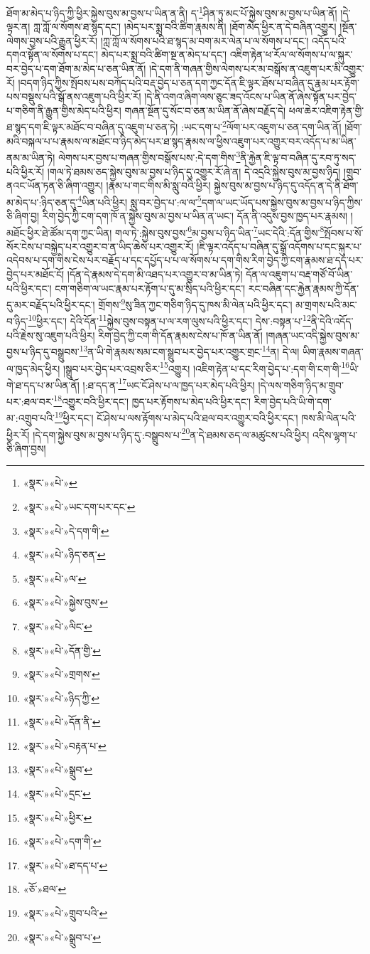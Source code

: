 ཐོག་མ་མེད་པ་ཉིད་ཀྱི་ཕྱིར་སྐྱེས་བུས་མ་བྱས་པ་ཡིན་ན་ནི། ད་\footnote{«སྣར་»«པེ་»}ཤིན་ཏུ་མང་པོ་སྐྱེས་བུས་མ་བྱས་པ་ཡིན་ནོ། །དེ་ལྟར་ན། ཀླ་ཀློ་ལ་སོགས་ཐ་སྙད་དང་། །མེད་པར་སྨྲ་བའི་ཚིག་རྣམས་ནི། །ཐོག་མེད་ཕྱིར་ན་དེ་བཞིན་འགྱུར། །སྔོན་ལེགས་བྱས་པའི་རྒྱུན་ཕྱིར་རོ། །ཀླ་ཀློ་ལ་སོགས་པའི་ཐ་སྙད་མ་བག་མར་ལེན་པ་ལ་སོགས་པ་དང་། འདོད་པའི་དགའ་སྟོན་ལ་སོགས་པ་དང་། མེད་པར་སྨྲ་བའི་ཚིག་སྔ་ན་མེད་པ་དང་། འཇིག་རྟེན་ཕ་རོལ་ལ་སོགས་པ་ལ་སྐུར་བར་བྱེད་པ་དག་ཐོག་མ་མེད་པ་ཅན་ཡིན་ནོ། །དེ་དག་ནི་གཞན་གྱིས་ལེགས་པར་མ་བསྒོས་ན་འཇུག་པར་མི་འགྱུར་རོ། །བདག་ཉིད་ཀྱིས་སྤོབས་པས་བཀོད་པའི་བརྡ་བྱེད་པ་ཅན་དག་ཀྱང་དོན་ཇི་ལྟར་ཐོས་པ་བཞིན་དུ་རྣམ་པར་རྟོག་པས་བསྡུས་པའི་སྒོ་ནས་འཇུག་པའི་ཕྱིར་རོ། །དེ་ནི་འགའ་ཞིག་ལས་ཅུང་ཟད་འོངས་པ་ཡིན་ནོ་ཞེས་སྟོན་པར་བྱེད་པ་གཅིག་ནི་རྒྱུན་གྱིས་མེད་པའི་ཕྱིར། གཞན་སྔོན་དུ་སོང་བ་ཅན་མ་ཡིན་ནོ་ཞེས་བརྗོད་དེ། ཕལ་ཆེར་འཇིག་རྟེན་གྱི་ཐ་སྙད་དག་ཇི་ལྟར་མཐོང་བ་བཞིན་དུ་འཇུག་པ་ཅན་ཏེ། :ཡང་དག་པ་\footnote{«སྣར་»«པེ་»ཡང་དག་པར་དང་}ལོག་པར་འཇུག་པ་ཅན་དག་ཡིན་ནོ། །ཐོག་མའི་བསྐལ་པ་པ་རྣམས་ལ་མཐོང་བ་ཉིད་མེད་པར་ཐ་སྙད་རྣམས་ལ་ཕྱིས་འཇུག་པར་འགྱུར་བར་འདོད་པ་མ་ཡིན་ནམ་མ་ཡིན་ཏེ། ལེགས་པར་བྱས་པ་གཞན་གྱིས་བསྒོས་པས་:དེ་དག་གིས་\footnote{«སྣར་»«པེ་»དེ་དག་གི་}ནི་རྐྱེན་ཇི་ལྟ་བ་བཞིན་དུ་རབ་ཏུ་སད་པའི་ཕྱིར་རོ། །གལ་ཏེ་ཐམས་ཅད་སྐྱེས་བུས་མ་བྱས་པ་ཉིད་དུ་འགྱུར་རོ་ཞེ་ན། དེ་འདྲའི་སྐྱེས་བུས་མ་བྱས་ཉིད། །གྲུབ་ནའང་ཡོན་ཏན་ཅི་ཞིག་འགྱུར། །རྣམ་པ་གང་གིས་མི་སླུ་བའི་ཕྱིར། སྐྱེས་བུས་མ་བྱས་པ་ཉིད་དུ་འདོད་ན་དེ་ནི་ཐོག་མ་མེད་པ་:ཉིད་ཅན་དུ་\footnote{«སྣར་»«པེ་»ཉིད་ཅན་}ཡིན་པའི་ཕྱིར། སླུ་བར་བྱེད་པ་:ལ་ལ་\footnote{«སྣར་»«པེ་»ལ་}དག་ལ་ཡང་ཡོད་པས་སྐྱེས་བུས་མ་བྱས་པ་ཉིད་ཀྱིས་ཅི་ཞིག་བྱ། རིག་བྱེད་ཀྱི་ངག་དག་ཁོ་ན་སྐྱེས་བུས་མ་བྱས་པ་ཡིན་ན་ཡང་། དོན་ནི་འདུས་བྱས་ཁྱད་པར་རྣམས། །མཐོང་ཕྱིར་ཐེ་ཚོམ་དག་ཀྱང་ཡིན། གལ་ཏེ་:སྐྱེས་བུས་བྱས་\footnote{«སྣར་»«པེ་»སྐྱེས་བུས་}མ་བྱས་པ་ཉིད་ཡིན་\footnote{«སྣར་»«པེ་»ལིང་}ཡང་དེའི་:དོན་གྱིས་\footnote{«སྣར་»«པེ་»དོན་གྱི་}སྤོབས་པ་སོ་སོར་ངེས་པ་བསྐྱེད་པར་འགྱུར་བ་ན་ཡིད་ཆེས་པར་འགྱུར་རོ། །ཇི་ལྟར་འདོད་པ་བཞིན་དུ་སྒྲོ་འདོགས་པ་དང་སྐུར་པ་འདེབས་པ་དག་གིས་ངེས་པར་བརྗོད་པ་དང་དཔྱོད་པ་པ་ལ་སོགས་པ་དག་གིས་རིག་བྱེད་ཀྱི་ངག་རྣམས་ཐ་དད་པར་བྱེད་པར་མཐོང་ངོ། །དོན་དེ་རྣམས་དེ་དག་མི་འཐད་པར་འགྱུར་བ་མ་ཡིན་ཏེ། དོན་ལ་འཇུག་པ་བརྡ་གཙོ་བོ་ཡིན་པའི་ཕྱིར་དང་། ངག་གཅིག་ལ་ཡང་རྣམ་པར་རྟོག་པ་དུ་མ་སྲིད་པའི་ཕྱིར་དང་། རང་བཞིན་དང་རྐྱེན་རྣམས་ཀྱི་དོན་དུ་མར་བརྗོད་པའི་ཕྱིར་དང་། གྲོགས་\footnote{«སྣར་»«པེ་»གྲགས་}སུ་ཟིན་ཀྱང་གཅིག་ཉིད་དུ་ཁས་མི་ལེན་པའི་ཕྱིར་དང་། མ་གྲགས་པའི་མང་བ་ཉིད་\footnote{«སྣར་»«པེ་»ཉིད་ཀྱི་}ཕྱིར་དང་། དེའི་དོན་\footnote{«སྣར་»«པེ་»དོན་ནི་}སྐྱེས་བུས་བསྟན་པ་ལ་རག་ལུས་པའི་ཕྱིར་དང་། དེས་:བསྟན་པ་\footnote{«སྣར་»«པེ་»བརྟན་པ་}ནི་དེའི་འདོད་པའི་རྗེས་སུ་འཇུག་པའི་ཕྱིར། རིག་བྱེད་ཀྱི་ངག་གི་དོན་རྣམས་ངེས་པ་ཁོ་ན་ཡིན་ནོ། །གཞན་ཡང་འདི་སྐྱེས་བུས་མ་བྱས་པ་ཉིད་དུ་བསྒྲུབས་\footnote{«སྣར་»«པེ་»སྒྲུབ་}ན་ཡི་གེ་རྣམས་སམ་ངག་སྒྲུབ་པར་བྱེད་པར་འགྱུར་གྲང་\footnote{«སྣར་»«པེ་»དྲང་}ན། དེ་ལ། ཡིག་རྣམས་གཞན་ལ་ཁྱད་མེད་ཕྱིར། །སྒྲུབ་པར་བྱེད་པར་འབྲས་ཅིར་\footnote{«སྣར་»«པེ་»ཕྱིར་}འགྱུར། །འཇིག་རྟེན་པ་དང་རིག་བྱེད་པ་:དག་གི་ངག་གི་\footnote{«སྣར་»«པེ་»དག་གི་}ཡི་གེ་ཐ་དད་པ་མ་ཡིན་ནོ། །:ཐ་དད་ན་\footnote{«སྣར་»«པེ་»ཐ་དད་པ་}ཡང་ངོ་ཤེས་པ་ལ་ཁྱད་པར་མེད་པའི་ཕྱིར། །དེ་ལས་གཅིག་ཉིད་མ་གྲུབ་པར་:ཐལ་བར་\footnote{«ཅོ་»ཐལ་}འགྱུར་བའི་ཕྱིར་དང་། ཁྱད་པར་རྟོགས་པ་མེད་པའི་ཕྱིར་དང་། རིག་བྱེད་པའི་ཡི་གེ་དག་མ་:འགྲུབ་པའི་\footnote{«སྣར་»«པེ་»གྲུབ་པའི་}ཕྱིར་དང་། ངོ་ཤེས་པ་ལས་རྟོགས་པ་མེད་པའི་ཐལ་བར་འགྱུར་བའི་ཕྱིར་དང་། ཁས་མི་ལེན་པའི་ཕྱིར་རོ། །དེ་དག་སྐྱེས་བུས་མ་བྱས་པ་ཉིད་དུ་:བསྒྲུབས་པ་\footnote{«སྣར་»«པེ་»སྒྲུབ་པ་}ན་དེ་ཐམས་ཅད་ལ་མཚུངས་པའི་ཕྱིར། འདིས་ལྷག་པ་ཅི་ཞིག་བྱས། 